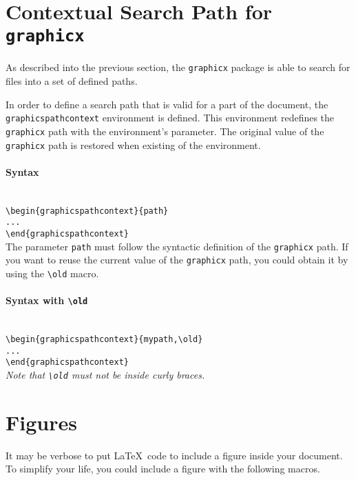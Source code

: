 \documentclass[book,taskpackage,specpackage,codepackage]{upmethodology-document}
\begin{document}
\section{Contextual Search Path for \texttt{graphicx}}

As described into the previous section, the \texttt{graphicx} package is able to search for files into a set of defined paths.

In order to define a search path that is valid for a part of the document, the \texttt{graphicspathcontext} environment is defined. This environment redefines the \texttt{graphicx} path with the environment's parameter. The original value of the \texttt{graphicx} path is restored when existing of the environment.

\paragraph{Syntax} \mbox{}\\
\texttt{{\textbackslash}begin\{graphicspathcontext\}\{path\}} \\
\texttt{...}\\
\texttt{{\textbackslash}end\{graphicspathcontext\}} \\


The parameter \texttt{path} must follow the syntactic definition of the \texttt{graphicx} path. If you want to reuse the current value of the \texttt{graphicx} path, you could obtain it by using the \texttt{{\textbackslash}old} macro.

\paragraph{Syntax with \texttt{{\textbackslash}old}} \mbox{}\\
\texttt{{\textbackslash}begin\{graphicspathcontext\}\{{mypath},{\textbackslash}old\}} \\
\texttt{...}\\
\texttt{{\textbackslash}end\{graphicspathcontext\}} \\

\emph{Note that \texttt{{\textbackslash}old} must not be inside curly braces.}


\section{Figures}

It may be verbose to put \LaTeX\ code to include a figure inside your document. To simplify your life, you could include a figure with the following macros.
\end{document}
